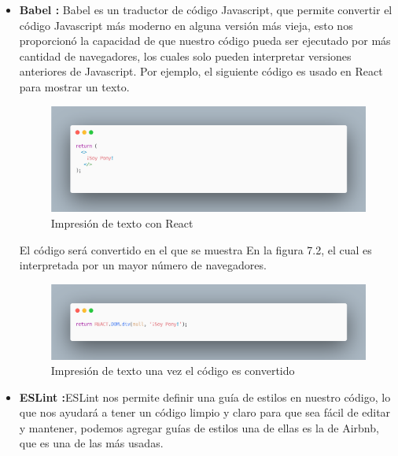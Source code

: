 \begin{itemize}
       \item \textbf{Babel  :}   Babel \cite{babel} es un traductor de código Javascript, que permite convertir el código Javascript más moderno en alguna versión más vieja, esto nos proporcionó la capacidad de que nuestro código pueda ser ejecutado por más cantidad de navegadores, los cuales solo pueden interpretar versiones anteriores de Javascript. Por ejemplo, el siguiente código es usado en React para mostrar un texto. 
    \begin{figure}[H]
    \includegraphics[width=1\textwidth]{./Imagenes/image16.png}
    \caption[Impresión de texto con React]{Impresión de texto con React}
    \end{figure}
       El código será convertido en el que se muestra En la figura 7.2, el cual es interpretada por un mayor número de navegadores. 
       \newline
       \newline
       \begin{figure}[H]
       \includegraphics[width=1\textwidth]{./Imagenes/image5.png}
        \caption[Impresión de texto una vez el código es convertido]{Impresión de texto una vez el código es convertido}
       \end{figure}
       \newline
       \newline
       \item \textbf{ESLint :}ESLint nos permite definir una guía de estilos en nuestro código, lo que nos ayudará a tener un código limpio y claro para que sea fácil de editar y mantener, podemos agregar guías de estilos una de ellas es la de Airbnb, que es una de las más usadas. 
       
    \end{itemize}